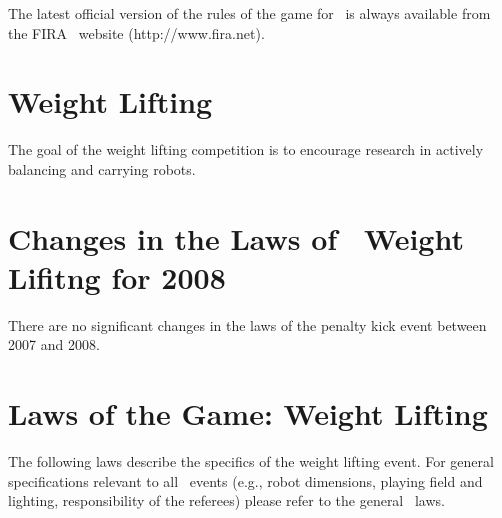 \documentclass[12pt]{hurocup}
\begin{document}
The latest official version of the rules of the game for \HuroCup\ is
always available from the FIRA \HuroCup\ website (http://www.fira.net).

\newpage

\section{Weight Lifting}
\label{sec:weight-lifting} 

The goal of the weight lifting competition is to encourage research in
actively balancing and carrying robots.

\section{Changes in the Laws of \HuroCup\ Weight Lifitng for 2008}

There are no significant changes in the laws of the penalty kick event
between 2007 and 2008.

\section{Laws of the Game: Weight Lifting}
\label{sec:weight-lifting-laws}

The following laws describe the specifics of the weight lifting
event. For general specifications relevant to all \HuroCup\ events
(e.g., robot dimensions, playing field and lighting, responsibility of
the referees) please refer to the general \HuroCup\ laws.

\label{mr-field}
\end{document}
